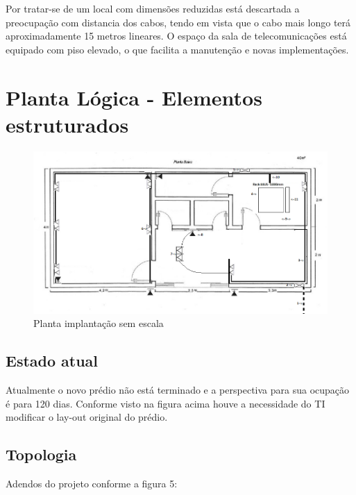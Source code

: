 \documentclass[	DIV=calc,%
							paper=a4,%
							fontsize=12pt,%
							onecolumn]{scrartcl}	 					%
\begin{document}
Por tratar-se de um local com dimensões reduzidas está descartada a preocupação com distancia dos cabos, tendo em vista que o cabo mais longo terá aproximadamente 15 metros lineares. 
O espaço da sala de telecomunicações está equipado com piso elevado, o que facilita a manutenção e novas implementações.


\section{Planta Lógica - Elementos estruturados}

\begin{figure}
	\centering
	\includegraphics[width=\textwidth]{fig5}
	\caption{Planta implantação sem escala}
	\label{fig5}
\end{figure}

\subsection{Estado atual}
Atualmente o novo prédio não está terminado e a perspectiva para sua ocupação é para 120 dias.
Conforme visto na figura acima houve a necessidade do TI modificar o lay-out original do prédio.

\subsection{Topologia}

Adendos do projeto conforme a figura 5:\\
\end{document}
